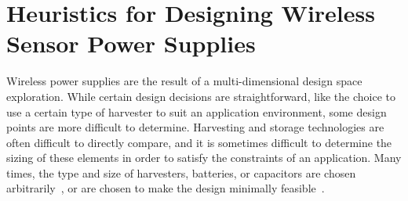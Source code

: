 \chapter{
Heuristics for Designing Wireless Sensor Power Supplies
}
\label{chap:intuition}

Wireless power supplies are the result of a multi-dimensional design space exploration.
While certain design decisions are straightforward, like the choice to use a certain type of harvester to suit an application environment, some design points are more difficult to determine. 
Harvesting and storage technologies are often difficult to directly compare, and it is sometimes difficult to determine the sizing of these elements in order to satisfy the constraints of an application. 
Many times, the type and size of harvesters, batteries, or capacitors are chosen arbitrarily~\cite{hamiltoniot,lee2013modular,juang2002energy}, or are chosen to make the design minimally feasible~\cite{yervaGrafting12,debruin2013monjolo,hesterFlicker17,afanasov2020battery}.

